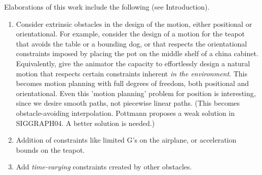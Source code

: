 \documentclass[12pt]{article}
\begin{document}
Elaborations of this work include the following (see Introduction).
\begin{enumerate}
\item
Consider extrinsic obstacles in the design 
of the motion, either positional or orientational.
For example, consider the design of a motion for the teapot that avoids
the table or a bounding dog, or that respects the orientational constraints 
imposed by placing the pot on the middle shelf of a china cabinet.
Equivalently, give the animator the capacity to effortlessly design 
a natural motion that respects 
certain constraints inherent {\em in the environment}.
This becomes motion planning with full degrees of freedom, both positional and
orientational.
Even this 'motion planning' problem for position is interesting, 
since we desire smooth paths, not piecewise linear paths.
(This becomes obstacle-avoiding interpolation.  Pottmann proposes a weak solution
in SIGGRAPH04.  A better solution is needed.)
\item
Addition of constraints like limited G's on the airplane, or acceleration bounds
on the teapot.
\item
Add {\em time-varying} constraints created by other obstacles.
\end{enumerate}


\end{document}
